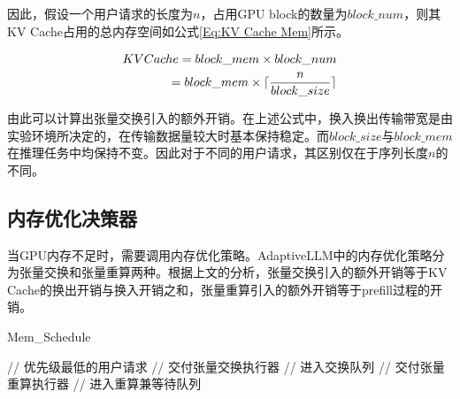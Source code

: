 因此，假设一个用户请求的长度为$n$，占用GPU block的数量为$block\_num$，则其KV Cache占用的总内存空间如公式\ref{Eq:KV Cache Mem}所示。

\begin{equation}
  \begin{aligned}
    KVCache = block\_mem \times block\_num  \\ =  block\_mem \times \lceil \frac{n}{block\_size} \rceil
  \end{aligned}
  \label{Eq:KV Cache Mem}
  \setlength{\abovedisplayskip}{0ex}
  \setlength{\belowdisplayskip}{2ex}
\end{equation}

由此可以计算出张量交换引入的额外开销。在上述公式中，换入换出传输带宽是由实验环境所决定的，在传输数据量较大时基本保持稳定。而$block\_size$与$block\_mem$在推理任务中均保持不变。因此对于不同的用户请求，其区别仅在于序列长度$n$的不同。

\subsection{内存优化决策器}

当GPU内存不足时，需要调用内存优化策略。AdaptiveLLM中的内存优化策略分为张量交换和张量重算两种。根据上文的分析，张量交换引入的额外开销等于KV Cache的换出开销与换入开销之和，张量重算引入的额外开销等于prefill过程的开销。

\begin{algorithm}
  \caption{Mem\_Schedule}
  \label{Code:内存优化决策器工作流程}
  \small
  \begin{spacing}{1.25}
    \begin{algorithmic}[1]
         \hfill {// 优先级最低的用户请求}
           \hfill {// 交付张量交换执行器}
           \hfill {// 进入交换队列}
        \ELSE
           \hfill {// 交付张量重算执行器}
           \hfill {// 进入重算兼等待队列}
        \ENDIF
      \ENDWHILE
    \end{algorithmic}
  \end{spacing}
\end{algorithm}

